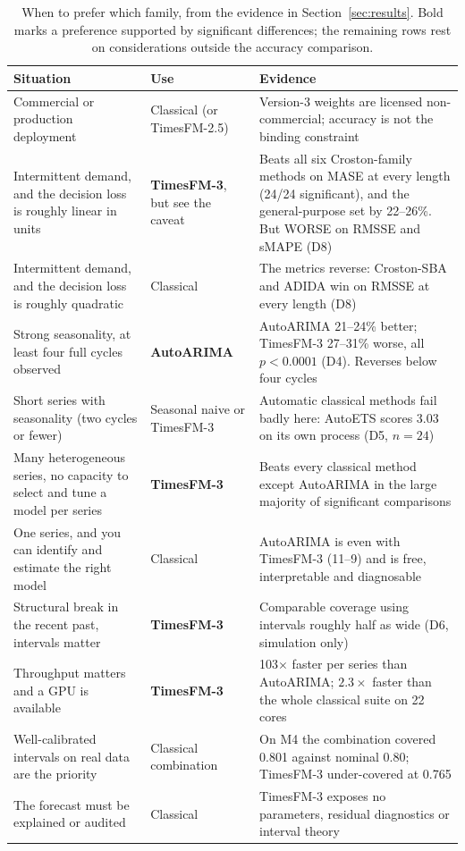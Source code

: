 \documentclass[article]{ajs}
\providecommand{\sectionref}[1]{Section~\ref{#1}}
\begin{document}
\begin{table}[t!]
\centering
\caption{When to prefer which family, from the evidence in \sectionref{sec:results}. Bold marks
a preference supported by significant differences; the remaining rows rest on considerations
outside the accuracy comparison.}
\label{tab:decision}
\small
\begin{tabular}{p{5.5cm}p{3.0cm}p{5.0cm}}
\toprule
Situation & Use & Evidence \\
\midrule
Commercial or production deployment
  & Classical (or TimesFM-2.5)
  & Version-3 weights are licensed non-commercial; accuracy is not the binding constraint \\[2pt]
Intermittent demand, and the decision loss is roughly linear in units
  & \textbf{TimesFM-3}, but see the caveat
  & Beats all six Croston-family methods on MASE at every length (24/24 significant), and the
    general-purpose set by 22--26\%. But WORSE on RMSSE and sMAPE (D8) \\[2pt]
Intermittent demand, and the decision loss is roughly quadratic
  & Classical
  & The metrics reverse: Croston-SBA and ADIDA win on RMSSE at every length (D8) \\[2pt]
Strong seasonality, at least four full cycles observed
  & \textbf{AutoARIMA}
  & AutoARIMA 21--24\% better; TimesFM-3 27--31\% worse, all $p < 0.0001$ (D4).
    Reverses below four cycles \\[2pt]
Short series with seasonality (two cycles or fewer)
  & Seasonal naive or TimesFM-3
  & Automatic classical methods fail badly here: AutoETS scores 3.03 on its own process (D5, $n=24$) \\[2pt]
Many heterogeneous series, no capacity to select and tune a model per series
  & \textbf{TimesFM-3}
  & Beats every classical method except AutoARIMA in the large majority of significant comparisons \\[2pt]
One series, and you can identify and estimate the right model
  & Classical
  & AutoARIMA is even with TimesFM-3 (11--9) and is free, interpretable and diagnosable \\[2pt]
Structural break in the recent past, intervals matter
  & \textbf{TimesFM-3}
  & Comparable coverage using intervals roughly half as wide (D6, simulation only) \\[2pt]
Throughput matters and a GPU is available
  & \textbf{TimesFM-3}
  & 103$\times$ faster per series than AutoARIMA; $2.3\times$ faster than the whole
    classical suite on 22 cores \\[2pt]
Well-calibrated intervals on real data are the priority
  & Classical combination
  & On M4 the combination covered 0.801 against nominal 0.80; TimesFM-3 under-covered at
    0.765 \\[2pt]
The forecast must be explained or audited
  & Classical
  & TimesFM-3 exposes no parameters, residual diagnostics or interval theory \\
\bottomrule
\end{tabular}
\end{table}
\end{document}
